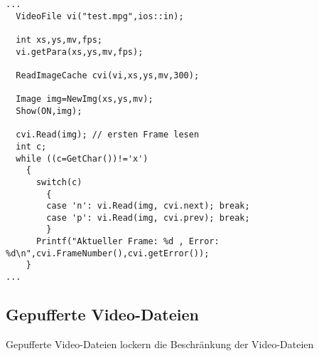 \begprogr
\begin{verbatim}
...
  VideoFile vi("test.mpg",ios::in);

  int xs,ys,mv,fps;
  vi.getPara(xs,ys,mv,fps);

  ReadImageCache cvi(vi,xs,ys,mv,300);

  Image img=NewImg(xs,ys,mv);
  Show(ON,img);

  cvi.Read(img); // ersten Frame lesen
  int c;
  while ((c=GetChar())!='x')
    {
      switch(c)
        {
        case 'n': vi.Read(img, cvi.next); break;
        case 'p': vi.Read(img, cvi.prev); break;
        }
      Printf("Aktueller Frame: %d , Error: %d\n",cvi.FrameNumber(),cvi.getError());
    }
...
\end{verbatim}
\endprogr

\subsection{Gepufferte Video-Dateien}
\label{VideoFileCached}
\hypertarget{VideoFileCached}{}
Gepufferte Video-Dateien lockern die Beschränkung der Video-Dateien 

